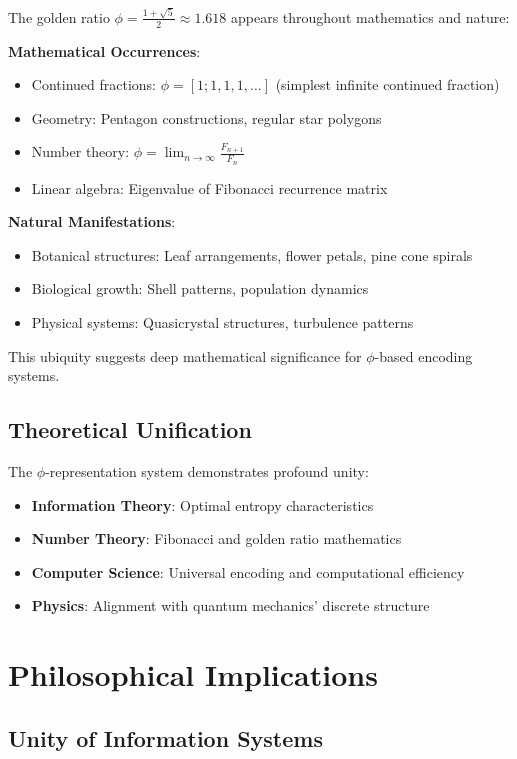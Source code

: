 \documentclass[12pt,letterpaper]{article}
\begin{document}
The golden ratio $\phi = \frac{1+\sqrt{5}}{2} \approx 1.618$ appears throughout mathematics and nature:

\textbf{Mathematical Occurrences}:
\begin{itemize}
\item Continued fractions: $\phi = [1;1,1,1,\ldots]$ (simplest infinite continued fraction)
\item Geometry: Pentagon constructions, regular star polygons
\item Number theory: $\phi = \lim_{n\to\infty} \frac{F_{n+1}}{F_n}$
\item Linear algebra: Eigenvalue of Fibonacci recurrence matrix
\end{itemize}

\textbf{Natural Manifestations}:
\begin{itemize}
\item Botanical structures: Leaf arrangements, flower petals, pine cone spirals
\item Biological growth: Shell patterns, population dynamics
\item Physical systems: Quasicrystal structures, turbulence patterns
\end{itemize}

This ubiquity suggests deep mathematical significance for $\phi$-based encoding systems.

\subsection{Theoretical Unification}

The $\phi$-representation system demonstrates profound unity:
\begin{itemize}
\item \textbf{Information Theory}: Optimal entropy characteristics
\item \textbf{Number Theory}: Fibonacci and golden ratio mathematics  
\item \textbf{Computer Science}: Universal encoding and computational efficiency
\item \textbf{Physics}: Alignment with quantum mechanics' discrete structure
\end{itemize}

\section{Philosophical Implications}

\subsection{Unity of Information Systems}
\end{document}
